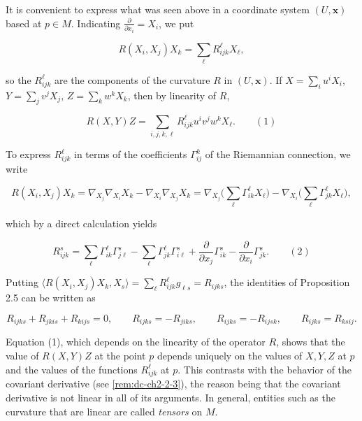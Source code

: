 \begin{remark}[Remark 2.6]
  \label{rem:dc-ch4-2-6}
\leanok
  It is convenient to express what was seen above in a coordinate system $(U,\mathbf{x})$
  based at $p\in M$. Indicating $\frac{\partial}{\partial x_i}=X_i$, we put
  
  $$
  R(X_i,X_j)X_k=\sum_\ell R_{ijk}^\ell X_\ell,
  $$
  
  so the $R_{ijk}^\ell$ are the components of the curvature $R$ in $(U,\mathbf{x})$.
  If $X=\sum_i u^i X_i$, $Y=\sum_j v^j X_j$, $Z=\sum_k w^k X_k$, then by linearity of
  $R$,
  
  $$
  R(X,Y)Z=\sum_{i,j,k,\ell}R_{ijk}^\ell u^i v^j w^k X_\ell.\qquad(1)
  $$
  
  To express $R_{ijk}^\ell$ in terms of the coefficients $\Gamma_{ij}^k$ of the
  Riemannian connection, we write
  
  $$
  R(X_i,X_j)X_k=\nabla_{X_j}\nabla_{X_i}X_k-\nabla_{X_i}\nabla_{X_j}X_k=\nabla_{X_j}\Big(\sum_\ell\Gamma_{ik}^\ell X_\ell\Big)-\nabla_{X_i}\Big(\sum_\ell\Gamma_{jk}^\ell X_\ell\Big),
  $$
  
  which by a direct calculation yields
  
  $$
  R_{ijk}^s=\sum_\ell\Gamma_{ik}^\ell\Gamma_{j\ell}^s-\sum_\ell\Gamma_{jk}^\ell\Gamma_{i\ell}^s+\frac{\partial}{\partial x_j}\Gamma_{ik}^s-\frac{\partial}{\partial x_i}\Gamma_{jk}^s.\qquad(2)
  $$
  
  Putting $\langle R(X_i,X_j)X_k,X_s\rangle=\sum_\ell R_{ijk}^\ell g_{\ell s}=R_{ijks}$,
  the identities of Proposition 2.5 can be written as
  
  $$
  R_{ijks}+R_{jkis}+R_{kijs}=0,\qquad R_{ijks}=-R_{jiks},\qquad R_{ijks}=-R_{ijsk},\qquad R_{ijks}=R_{ksij}.
  $$
  
  Equation (1), which depends on the linearity of the operator $R$, shows that the
  value of $R(X,Y)Z$ at the point $p$ depends uniquely on the values of $X,Y,Z$ at
  $p$ and the values of the functions $R_{ijk}^\ell$ at $p$. This contrasts with the
  behavior of the covariant derivative (see \cref{rem:dc-ch2-2-3}), the reason
  being that the covariant derivative is not linear in all of its arguments. In
  general, entities such as the curvature that are linear are called \emph{tensors} on
  $M$.
\end{remark}

